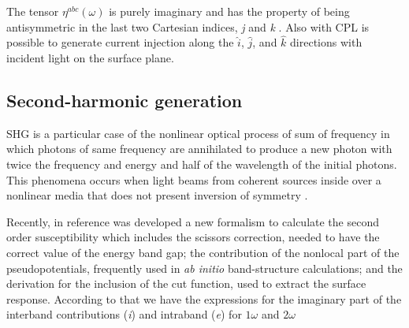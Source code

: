 \documentclass[pss]{wiley2sp} %
\begin{document}
\begin{changed}
The tensor $\eta^{abc}(\omega)$ is purely imaginary and has the property of being antisymmetric in the last two Cartesian indices, \emph{j} and \emph{k} \cite{sipe2000second,nastos2006optical}. Also with CPL is possible to generate current injection along the $\hat{i}$, $\hat{j}$, and $\hat{k}$ directions with incident light on the surface plane.


\end{changed}


\subsection{Second-harmonic generation}

SHG is a particular case of the nonlinear optical process of sum of frequency in which photons of same frequency are annihilated to produce a new photon with twice the frequency and energy and half of the wavelength of the initial photons. This phenomena occurs when light beams from coherent sources inside over a nonlinear media that does not present inversion of symmetry \cite{bloembergen1962light,anderson2015theory,sipe2000second}.

Recently, in reference \cite{anderson2015theory} was developed a new formalism to calculate the second order susceptibility which includes the scissors correction, needed to have the correct value of the energy band gap; the contribution of the nonlocal part of the pseudopotentials, frequently used in \emph{ab initio} band-structure calculations; and the derivation for the inclusion of the cut function, used to extract the surface response. According to that we have the expressions for the imaginary part of the interband contributions (\emph{i}) and intraband (\emph{e}) for $1\omega$ and $2\omega$
\end{document}
